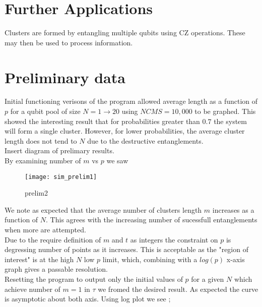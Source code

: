\documentclass{article}
\numberwithin{equation}{section} %
\begin{document}
 

        
           
           


\section{Further Applications}
Clusters are formed by entangling multiple qubits using CZ operations. These may then be used to process information.
           
\section{Preliminary data}
Initial functioning verisons of the program allowed average length as a function of $p$ for a qubit pool of size $N=1 \rightarrow 20$ using $NCMS= 10,000$ to be graphed. This showed the interesting result that for probabilities greater than $0.7$ the system will form a single cluster. However, for lower probabilities, the average cluster length does not tend to $N$ due to the destructive entanglements. \\

Insert diagram of prelimary results. \\

By examining number of $m$ vs $p$ we saw \\

\begin{figure}[h]
\begin{center}
\texttt{[image: sim\_prelim1]}
\caption{prelim2}
\label{just}
\end{center}
\end{figure}

We note as expected that the average number of clusters length $m$ increases as a function of $N$. This agrees with the increasing number of sucessfull entanglements when more are attempted. \\

Due to the require definition of $m$ and $t$ as integers the constraint on $p$ is degressing number of points as it increases. This is acceptable as the "region of interest" is at the high $N$ low $p$ limit, which, combining with a $log(p)$ x-axis graph gives a passable resolution.\\

Resetting the program to output only the initial values of $p$ for a given $N$ which achieve number of $m=1$ in $\tau$ we fromed the desired result. As expected the curve is asymptotic about both axis. Using log plot we see ;
\end{document}
